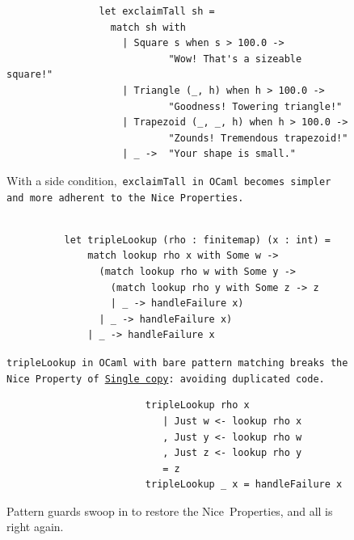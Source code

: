 \documentclass[manuscript,screen 12pt, nonacm]{acmart}
\begin{document}
       \begin{figure}[]
            \begin{verbatim}
                let exclaimTall sh =
                  match sh with 
                    | Square s when s > 100.0 ->
                            "Wow! That's a sizeable square!"
                    | Triangle (_, h) when h > 100.0 ->
                            "Goodness! Towering triangle!"
                    | Trapezoid (_, _, h) when h > 100.0 -> 
                            "Zounds! Tremendous trapezoid!"
                    | _ ->  "Your shape is small." 
                \end{verbatim}
            \caption{With a side condition,~\tt{exclaimTall} in OCaml becomes
            simpler and more adherent to the Nice~Properties.} 
            \label{fig:whenexclaimtall}
        \end{figure}


\begin{figure}[ht]
        \begin{verbatim}

          let tripleLookup (rho : finitemap) (x : int) =
              match lookup rho x with Some w -> 
                (match lookup rho w with Some y -> 
                  (match lookup rho y with Some z -> z
                  | _ -> handleFailure x)
                | _ -> handleFailure x)
              | _ -> handleFailure x
            \end{verbatim}
        \caption{\tt{tripleLookup} in OCaml with bare pattern matching breaks
         the Nice~Property of~\hyperref[p2]{Single copy}: avoiding duplicated
         code.} 
                    
        \label{fig:pmtriplelookup}
    \end{figure}

     \begin{figure}
        \begin{center}
        \begin{verbatim}
                        tripleLookup rho x
                           | Just w <- lookup rho x
                           , Just y <- lookup rho w
                           , Just z <- lookup rho y
                           = z
                        tripleLookup _ x = handleFailure x
        \end{verbatim}
        \end{center}    
    \caption{Pattern guards swoop in to restore the Nice~Properties, and all is
    right again.} 
    \label{fig:guardtriplelookup}
    \end{figure}
\end{document}
